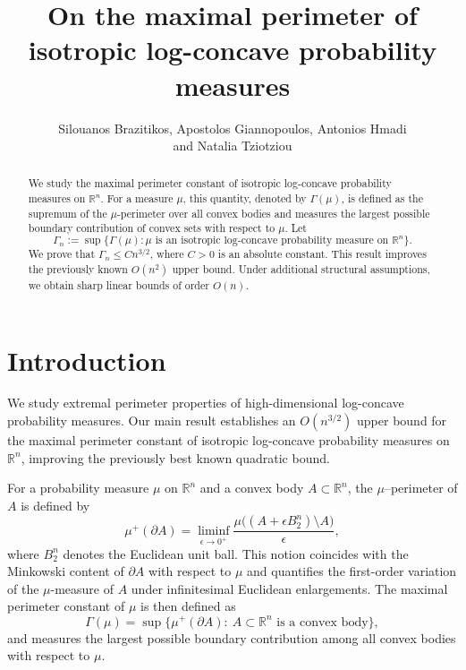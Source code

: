\documentclass[11pt,leqno]{article}
\theoremstyle{remark}
\numberwithin{equation}{section}
\newcommand{\ls}{\leqslant}
\begin{document}
\small

\title{\bf On the maximal perimeter of isotropic log-concave probability measures}

\author{Silouanos Brazitikos, Apostolos Giannopoulos, Antonios Hmadi\\ and Natalia Tziotziou}

\date{}

\maketitle

\begin{abstract}\footnotesize 
We study the maximal perimeter constant of isotropic log-concave probability measures on $\mathbb{R}^n$.
For a measure $\mu$, this quantity, denoted by $\Gamma(\mu)$, is defined as the supremum of the $\mu$-perimeter over all convex bodies and measures the largest possible boundary contribution of convex sets with respect to $\mu$.
Let
$$\Gamma_n := \sup\{\Gamma(\mu) : \mu \text{ is an isotropic log-concave probability measure on } \mathbb{R}^n\}.$$
We prove that $\Gamma_n \ls Cn^{3/2}$, where $C>0$ is an absolute constant. 
This result improves the previously known $O(n^2)$ upper bound. 
Under additional structural assumptions, we obtain sharp linear bounds of order $O(n)$.
\end{abstract}

\section{Introduction}\label{section:1}

We study extremal perimeter properties of high-dimensional log-concave probability measures. 
Our main result establishes an $O(n^{3/2})$ upper bound for the maximal perimeter constant of isotropic log-concave probability measures on $\mathbb{R}^n$, improving the previously best known quadratic bound.

For a probability measure $\mu$ on $\mathbb{R}^n$ and a convex body $A \subset \mathbb{R}^n$, the $\mu$--perimeter of $A$ is defined by
$$\mu^+(\partial A)=\liminf_{\epsilon \to 0^+}\frac{\mu\big((A+\epsilon B_2^n)\setminus A\big)}{\epsilon},$$
where $B_2^n$ denotes the Euclidean unit ball.
This notion coincides with the Minkowski content of $\partial A$ with respect to $\mu$ and quantifies the first-order variation of the $\mu$-measure of $A$ under infinitesimal Euclidean enlargements.
The maximal perimeter constant of $\mu$ is then defined as 
$$\Gamma(\mu)=\sup\big\{\mu^+(\partial A):\ A \subset \mathbb{R}^n \text{ is a convex body}\big\},$$
and measures the largest possible boundary contribution among all convex bodies with respect to $\mu$.
\end{document}

